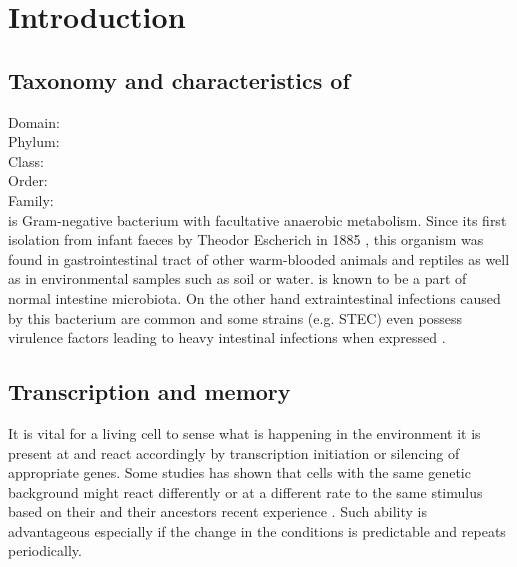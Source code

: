 \renewcommand{\chaptername}{Introduction}
\chapter*{Introduction}
\setcounter{page}{1}


\shorthandoff{-} 

\section{Taxonomy and characteristics of }
\hspace*{0,5cm} Domain: \hspace{0,5cm} \\%
\hspace*{1,5cm} Phylum: \hspace{0,5cm} \\%
\hspace*{2,5cm} Class: \hspace{0,5cm} \\%
\hspace*{3,5cm} Order: \hspace{0,5cm} \\%
\hspace*{4,5cm} Family: \hspace{0,5cm} \\%

 is Gram-negative bacterium with facultative anaerobic metabolism.
Since its first isolation from infant faeces by Theodor Escherich in 1885 \cite{friedmann2006escherich}, this organism was found in gastrointestinal tract of other warm-blooded animals and reptiles \cite{gopee2000longitudinal} as well as in environmental samples such as soil or water.
 is known to be a part of normal intestine microbiota.
On the other hand extraintestinal infections caused by this bacterium are common and some strains (e.g. STEC) even possess virulence factors leading to heavy intestinal infections when expressed \cite{allocati2013escherichia}.

\section{Transcription and memory}
It is vital for a living cell to sense what is happening in the environment it is present at and react accordingly by transcription initiation or silencing of appropriate genes.
Some studies has shown that cells with the same genetic background might react differently or at a different rate to the same stimulus based on their and their ancestors recent experience \cite{mathis2017asymmetric, ronin2017long}.
Such ability is advantageous especially if the change in the conditions is predictable and repeats periodically.

